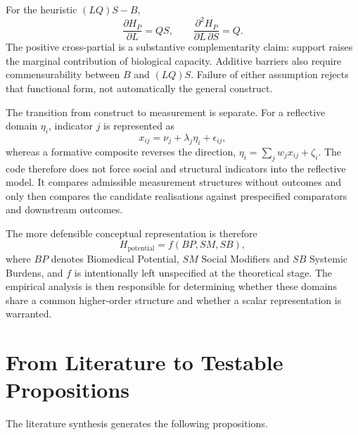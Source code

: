 For the heuristic $(LQ)S-B$,
\begin{equation}
\frac{\partial H_P}{\partial L}=QS,
\qquad
\frac{\partial^2 H_P}{\partial L\,\partial S}=Q.
\label{eq:heuristic_derivatives}
\end{equation}
The positive cross-partial is a substantive complementarity claim: support
raises the marginal contribution of biological capacity. Additive barriers also
require commensurability between $B$ and $(LQ)S$. Failure of either assumption
rejects that functional form, not automatically the general construct.

The transition from construct to measurement is separate. For a reflective
domain $\eta_i$, indicator $j$ is represented as
\begin{equation}
x_{ij}=\nu_j+\lambda_j\eta_i+\epsilon_{ij},
\label{eq:reflective_measurement_bridge}
\end{equation}
whereas a formative composite reverses the direction,
$\eta_i=\sum_j w_jx_{ij}+\zeta_i$. The code therefore does not force social
and structural indicators into the reflective model. It compares admissible
measurement structures without outcomes and only then compares the candidate
realisations against prespecified comparators and downstream outcomes.

The more defensible conceptual representation is therefore
\begin{equation}
H_{\text{potential}}=f(BP,SM,SB),
\end{equation}
where $BP$ denotes Biomedical Potential, $SM$ Social Modifiers and $SB$ Systemic Burdens, and $f$ is intentionally left unspecified at the theoretical stage. The empirical analysis is then responsible for determining whether these domains share a common higher-order structure and whether a scalar representation is warranted.

\section{From Literature to Testable Propositions}

The literature synthesis generates the following propositions.

